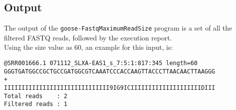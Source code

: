 \subsection*{Output}
The output of the \texttt{goose-FastqMaximumReadSize} program is a set of all the filtered FASTQ reads, followed by the execution report.\\
Using the size value as 60, an example for this input, is: 
\begin{lstlisting}
@SRR001666.1 071112_SLXA-EAS1_s_7:5:1:817:345 length=60
GGGTGATGGCCGCTGCCGATGGCGTCAAATCCCACCAAGTTACCCTTAACAACTTAAGGG
+
IIIIIIIIIIIIIIIIIIIIIIIIIIIIII9IG9ICIIIIIIIIIIIIIIIIIIIIDIII
Total reads    : 2
Filtered reads : 1
\end{lstlisting}
